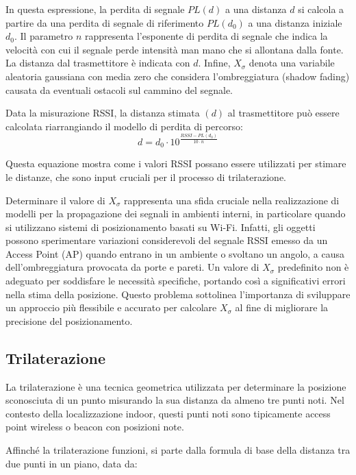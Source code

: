 \noindent In questa espressione, la perdita di segnale $PL(d)$ a una distanza $d$ si calcola a partire da una perdita di segnale di riferimento $PL(d_0)$ a una distanza iniziale $d_0$. Il parametro $n$ rappresenta l'esponente di perdita di segnale che indica la velocità con cui il segnale perde intensità man mano che si allontana dalla fonte. La distanza dal trasmettitore è indicata con $d$. Infine, $X_{\sigma}$ denota una variabile aleatoria gaussiana con media zero che considera l'ombreggiatura (shadow fading) causata da eventuali ostacoli sul cammino del segnale.

Data la misurazione RSSI, la distanza stimata $(d)$ al trasmettitore può essere calcolata riarrangiando il modello di perdita di percorso:
\begin{equation}
    \displaystyle{d = d_0 \cdot 10^{\frac{RSSI - PL(d_0)}{10 \cdot n}}}
\end{equation}

\noindent Questa equazione mostra come i valori RSSI possano essere utilizzati per stimare le distanze, che sono input cruciali per il processo di trilaterazione.

Determinare il valore di $X_{\sigma}$ rappresenta una sfida cruciale nella realizzazione di modelli per la propagazione dei segnali in ambienti interni, in particolare quando si utilizzano sistemi di posizionamento basati su Wi-Fi. Infatti, gli oggetti possono sperimentare variazioni considerevoli del segnale RSSI emesso da un Access Point (AP) quando entrano in un ambiente o svoltano un angolo, a causa dell'ombreggiatura provocata da porte e pareti. Un valore di $X_{\sigma}$ predefinito non è adeguato per soddisfare le necessità specifiche, portando così a significativi errori nella stima della posizione. Questo problema sottolinea l'importanza di sviluppare un approccio più flessibile e accurato per calcolare $X_{\sigma}$ al fine di migliorare la precisione del posizionamento.

\subsection{Trilaterazione}
\hspace{\parindent}La trilaterazione è una tecnica geometrica utilizzata per determinare la posizione sconosciuta di un punto misurando la sua distanza da almeno tre punti noti. Nel contesto della localizzazione indoor, questi punti noti sono tipicamente access point wireless o beacon con posizioni note.

\noindent Affinché la trilaterazione funzioni, si parte dalla formula di base della distanza tra due punti in un piano, data da:

